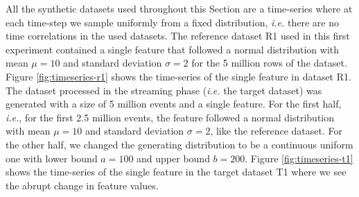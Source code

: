 All the synthetic datasets used throughout this Section are a time-series where at each time-step we sample uniformly from a fixed distribution, \textit{i.e.} there are no time correlations in the used datasets. The reference dataset R1 used in this first experiment contained a single feature that followed a normal distribution with mean $\mu=10$ and standard deviation $\sigma=2$ for the 5 million rows of the dataset. Figure \ref{fig:timeseries-r1} shows the time-series of the single feature in dataset R1. The dataset processed in the streaming phase (\textit{i.e.} the target dataset) was generated with a size of 5 million events and a single feature. For the first half, \textit{i.e.}, for the first 2.5 million events, the feature followed a normal distribution with mean $\mu=10$ and standard deviation $\sigma=2$, like the reference dataset. For the other half, we changed the generating distribution to be a continuous uniform one with lower bound $a=100$ and upper bound $b=200$. Figure \ref{fig:timeseries-t1} shows the time-series of the single feature in the target dataset T1 where we see the abrupt change in feature values.
